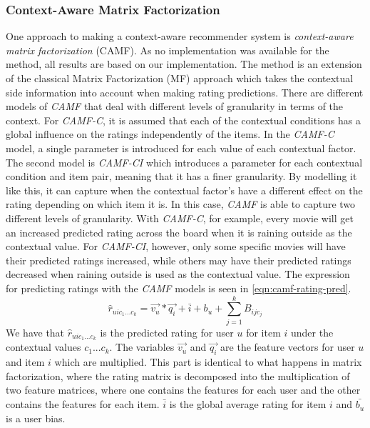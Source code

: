 \subsubsection{Context-Aware Matrix Factorization}\label{subsec:camf}
One approach to making a context-aware recommender system is \textit{context-aware matrix factorization} (CAMF)\cite{baltrunasCAMF}.
As no implementation was available for the method, all results are based on our implementation.
The method is an extension of the classical Matrix Factorization (MF) approach which takes the contextual side information into account when making rating predictions.
There are different models of \textit{CAMF} that deal with different levels of granularity in terms of the context.
For \textit{CAMF-C}, it is assumed that each of the contextual conditions has a global influence on the ratings independently of the items.
In the \textit{CAMF-C} model, a single parameter is introduced for each value of each contextual factor.
The second model is \textit{CAMF-CI} which introduces a parameter for each contextual condition and item pair, meaning that it has a finer granularity.
By modelling it like this, it can capture when the contextual factor's have a different effect on the rating depending on which item it is.
In this case, \textit{CAMF} is able to capture two different levels of granularity.
With \textit{CAMF-C}, for example, every movie will get an increased predicted rating across the board when it is raining outside as the contextual value.
For \textit{CAMF-CI}, however, only some specific movies will have their predicted ratings increased, while others may have their predicted ratings decreased when raining outside is used as the contextual value.
The expression for predicting ratings with the \textit{CAMF} models is seen in \autoref{eqn:camf-rating-pred}.
\begin{equation}
    \label{eqn:camf-rating-pred}
    \hat{r}_{uic_1...c_k} = \vec{v_u} * \vec{q_i} + \bar{i} + b_u + \sum\limits_{j = 1}^k B_{ijc_j}
\end{equation}
We have that $\hat{r}_{uic_1...c_k}$ is the predicted rating for user $u$ for item $i$ under the contextual values $c_1...c_k$.
The variables $\vec{v_u} $ and $ \vec{q_i}$ are the feature vectors for user $u$ and item $i$ which are multiplied.
This part is identical to what happens in matrix factorization, where the rating matrix is decomposed into the multiplication of two feature matrices, where one contains the features for each user and the other contains the features for each item.
$\bar{i}$ is the global average rating for item $i$ and $\bar{b_u}$ is a user bias. 
